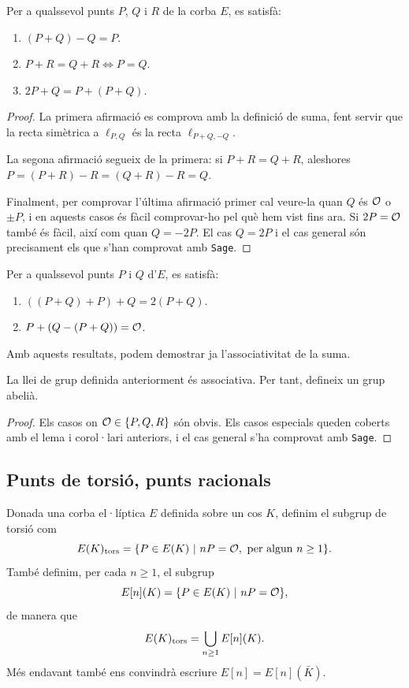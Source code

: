 \begin{lemma}
Per a qualssevol punts $P$, $Q$ i $R$ de la corba $E$, es satisfà:
 \begin{enumerate}
     \item $(P+Q)-Q = P$.
     \item $P+R = Q+R \iff P = Q$.
     \item $2P + Q = P+(P+Q)$.
 \end{enumerate}
\end{lemma}
\begin{proof}
 La primera afirmació es comprova amb la definició de suma, fent servir que la recta simètrica a $\ell_{P,Q}$ és la recta $\ell_{P+Q,-Q}$.
 
 La segona afirmació segueix de la primera: si $P+R=Q+R$, aleshores $P = (P+R)-R = (Q+R) -R = Q$.
 
 Finalment, per comprovar l'última afirmació primer cal veure-la quan $Q$ és $\mathcal{O}$ o $\pm P$, i en aquests casos és fàcil comprovar-ho pel què hem vist fins ara. Si $2P=\mathcal{O}$ també és fàcil, així com quan $Q=-2P$. El cas $Q=2P$ i el cas general són precisament els que s'han comprovat amb \texttt{Sage}.
\end{proof}
\begin{corollary}
Per a qualssevol punts $P$ i $Q$ d'$E$, es satisfà:
 \begin{enumerate}
     \item $((P+Q)+P)+Q = 2(P+Q)$.
     \item $P+(Q-(P+Q))=\mathcal{O}$.
 \end{enumerate}
\end{corollary}

Amb aquests resultats, podem demostrar ja l'associativitat de la suma.
\begin{theorem}
La llei de grup definida anteriorment és associativa. Per tant, defineix un grup abelià.
\end{theorem}
\begin{proof}
 Els casos on $\mathcal{O}\in\{P,Q,R\}$ són obvis. Els casos especials queden coberts amb el lema i corol·lari anteriors, i el cas general s'ha comprovat amb \texttt{Sage}.
\end{proof}
 \subsection{Punts de torsió, punts racionals}
 Donada una corba el·líptica $E$ definida sobre un cos $K$, definim el subgrup de torsió com
 \[
 E(K)_{\textrm{tors}} = \{P\in E(K) ~|~ nP=\mathcal{O},\text{ per algun } n\geq 1\}.
 \]
 També definim, per cada $n\geq 1$, el subgrup
 \[
 E[n](K) = \{P\in E(K) ~|~ nP=\mathcal{O}\},
 \]
 de manera que
 \[
 E(K)_{\textrm{tors}} = \bigcup_{n\geq 1} E[n](K).
 \]
 Més endavant també ens convindrà escriure $E[n] = E[n](\bar K)$.
 
